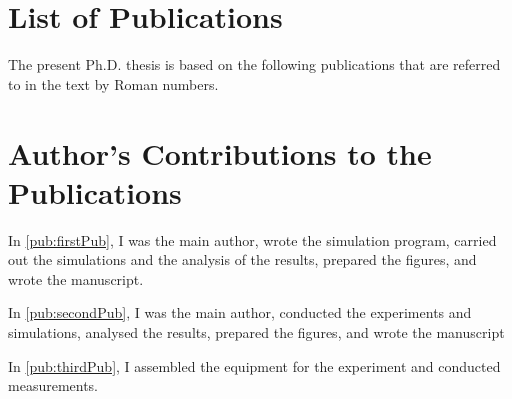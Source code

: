 \section*{List of Publications} %

\nobibliography*
The present Ph.D. thesis is based on the following publications that are referred to in the text by Roman numbers.\\
\vspace{-2mm}
\begin{publications}
\item \label{pub:firstPub}  \bibentry{\FirstArticle} 
\item \label{pub:secondPub} \bibentry{\SecondArticle}
\item \label{pub:thirdPub}  \bibentry{\ThirdArticle}
\end{publications}


\section*{Author's Contributions to the Publications}  %
\begin{contriblist}
\item In \ref{pub:firstPub}, I was the main author, wrote the simulation program, carried out the simulations and the analysis of the results, prepared the figures, and wrote the manuscript. 
\item In \ref{pub:secondPub}, I was the main author, conducted the experiments and simulations, analysed the results, prepared the figures, and wrote the manuscript
\item In \ref{pub:thirdPub}, I assembled the equipment for the experiment and conducted measurements. 
\end{contriblist}


